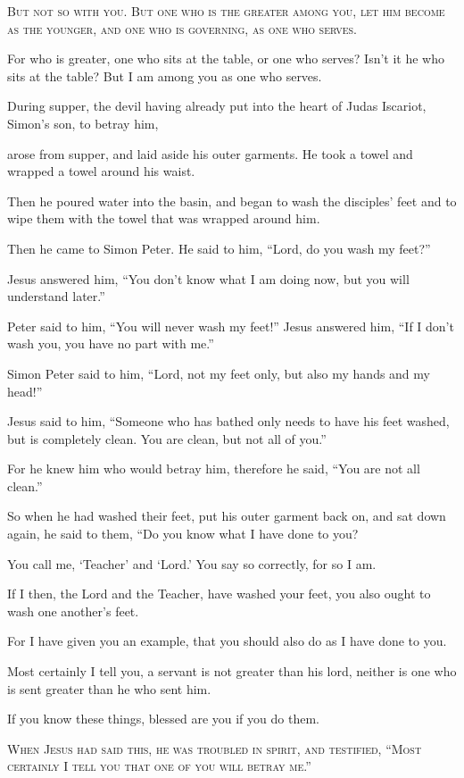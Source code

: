 \lettrine{B}{ut not so with you. But one who is the greater among you, let him become as the younger, and one who is governing, as one who serves.}

For who is greater, one who sits at the table, or one who serves? Isn’t it he who sits at the table? But I am among you as one who serves.

During supper, the devil having already put into the heart of Judas Iscariot, Simon’s son, to betray him,

arose from supper, and laid aside his outer garments. He took a towel and wrapped a towel around his waist.

Then he poured water into the basin, and began to wash the disciples’ feet and to wipe them with the towel that was wrapped around him.

Then he came to Simon Peter. He said to him, “Lord, do you wash my feet?”

Jesus answered him, “You don’t know what I am doing now, but you will understand later.”

Peter said to him, “You will never wash my feet!” Jesus answered him, “If I don’t wash you, you have no part with me.”

Simon Peter said to him, “Lord, not my feet only, but also my hands and my head!”

Jesus said to him, “Someone who has bathed only needs to have his feet washed, but is completely clean. You are clean, but not all of you.”

For he knew him who would betray him, therefore he said, “You are not all clean.”

So when he had washed their feet, put his outer garment back on, and sat down again, he said to them, “Do you know what I have done to you?

You call me, ‘Teacher’ and ‘Lord.’ You say so correctly, for so I am.

If I then, the Lord and the Teacher, have washed your feet, you also ought to wash one another’s feet.

For I have given you an example, that you should also do as I have done to you.

Most certainly I tell you, a servant is not greater than his lord, neither is one who is sent greater than he who sent him.

If you know these things, blessed are you if you do them.




\lettrine{W}{hen Jesus had said this, he was troubled in spirit, and testified, “Most certainly I tell you that one of you will betray me.”}

